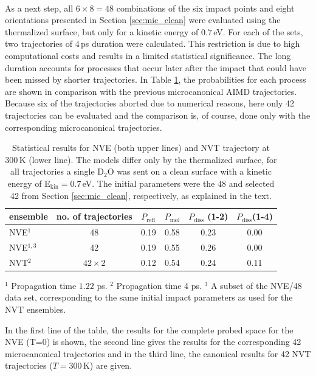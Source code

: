 \documentclass[11pt,DIV=13,BCOR=5mm,a4paper,headinclude]{scrbook}
\begin{document}
\\
As a next step, all $6\times 8=48$ combinations of the six impact points and eight orientations presented in Section \ref{sec:mic_clean} were evaluated using the thermalized surface, but only for a kinetic energy of $0.7\,$eV.
For each of the sets, two trajectories of $4\,$ps duration were calculated.
This restriction is due to high computational costs and results in a limited statistical significance.
The long duration accounts for processes that occur later after the impact that could have been missed by shorter trajectories.
In Table \ref{tab:nvt-nve_comp}, the probabilities for each process are shown in comparison with the previous microcanonical AIMD trajectories.
Because six of the trajectories aborted due to numerical reasons, here only 42 trajectories can be evaluated and the comparison is, of course, done only with the corresponding microcanonical trajectories.
\begin{table}[!h]
 \centering
 \caption{Statistical results for NVE (both upper lines) and NVT trajectory at $300\,$K (lower line).
The models differ only by the thermalized surface, for all trajectories a single D$_2$O was sent on a clean surface with a kinetic energy of E$_\textrm{kin}=0.7\,$eV.
The initial parameters were the 48 and selected 42 from Section \ref{sec:mic_clean}, respectively, as explained in the text.}
\vspace*{.2cm}
  \begin{tabular}{lc|cccc}
 \toprule
  ensemble & no.
of trajectories & $P_\textrm{refl}$ & $P_\textrm{mol}$ & $P_\textrm{diss}$ (1-2) & $P_\textrm{diss}$(1-4) 
 \\\midrule
 NVE$^1$         & 48 & 0.19 & 0.58 & 0.23 & 0.00 \\
 NVE$^{1,3}$     & 42 & 0.19 & 0.55 & 0.26 & 0.00 \\
 NVT$^2$ &$42\times 2$& 0.12 & 0.54 & 0.24 & 0.11 \\\bottomrule
  \end{tabular}
\begin{tablenotes}
 \footnotesize
\item[] $^1$ Propagation time $1.22$ ps.
$^2$ Propagation time 4 ps.
$^3$ A subset of the NVE/48 data set,  corresponding to the same initial impact parameters as used for the NVT ensembles.
\end{tablenotes}
\label{tab:nvt-nve_comp}
\end{table}
In the first line of the table, the results for the complete probed space for the NVE (T=0) is shown, the second line gives the results for the corresponding 42 microcanonical trajectories and in the third line, the canonical results for 42 NVT trajectories ($T=300\,$K) are given.
\end{document}
